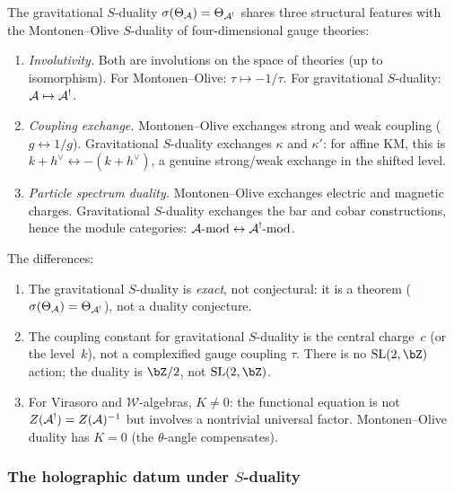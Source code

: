 \begin{remark}
The gravitational $S$-duality $\sigma(\Theta_{\mathcal{A}}) = \Theta_{\mathcal{A}^!}$
shares three structural features with the Montonen--Olive $S$-duality
of four-dimensional gauge theories:
\begin{enumerate}[label=\textup{(\roman*)}]
\item \emph{Involutivity.} Both are involutions on the space of
 theories (up to isomorphism). For Montonen--Olive: $\tau \mapsto -1/\tau$.
 For gravitational $S$-duality: $\mathcal{A} \mapsto \mathcal{A}^!$.
\item \emph{Coupling exchange.} Montonen--Olive exchanges strong and
 weak coupling ($g \leftrightarrow 1/g$). Gravitational $S$-duality
 exchanges $\kappa$ and $\kappa'$: for affine KM, this is
 $k + h^\vee \leftrightarrow -(k + h^\vee)$, a genuine strong/weak
 exchange in the shifted level.
\item \emph{Particle spectrum duality.} Montonen--Olive exchanges
 electric and magnetic charges. Gravitational $S$-duality exchanges
 the bar and cobar constructions, hence the module categories:
 $\mathcal{A}\text{-mod} \leftrightarrow \mathcal{A}^!\text{-mod}$.
\end{enumerate}

The differences:
\begin{enumerate}[label=\textup{(\roman*)}]
\item The gravitational $S$-duality is \emph{exact}, not conjectural:
 it is a theorem ($\sigma(\Theta_{\mathcal{A}}) = \Theta_{\mathcal{A}^!}$), not a
 duality conjecture.
\item The coupling constant for gravitational $S$-duality is
 the central charge~$c$ (or the level~$k$), not a complexified gauge
 coupling $\tau$. There is no $\mathrm{SL}(2, \bZ)$
 action; the duality is $\bZ/2$, not $\mathrm{SL}(2, \bZ)$.
\item For Virasoro and $\mathcal{W}$-algebras, $K \neq 0$: the
 functional equation is not $Z(\mathcal{A}^!) = Z(\mathcal{A})^{-1}$ but involves a
 nontrivial universal factor. Montonen--Olive duality has $K = 0$
 (the $\theta$-angle compensates).
\end{enumerate}
\end{remark}

\subsubsection{The holographic datum under $S$-duality}

